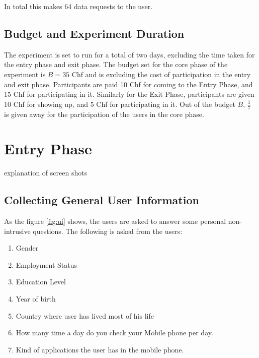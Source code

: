 In total this makes 64 data requests to the user.

\subsection{Budget and Experiment Duration}
The experiment is set to run for a total of two days, excluding the time taken for the entry phase and exit phase.
The budget set for the core phase of the experiment is $B=35$ Chf and is excluding the cost of participation
in the entry and exit phase. Participants are paid 10 Chf for coming to the Entry Phase, and 15 Chf for
participating in it. Similarly for the Exit Phase, participants are given 10 Chf for showing up, and 5 Chf for participating in it.
Out of the budget $B$, $\frac{1}{7}$ is given away for the participation of the users in the core phase.


\section{Entry Phase}
explanation of screen shots

\subsection{Collecting General User Information}
As the figure \ref{fig:ui} shows, the users are asked to answer some personal non-intrusive questions. The following is asked from the users: 
\begin{enumerate}
    \item Gender
    \item Employment Status
    \item Education Level
    \item Year of birth
    \item Country where user has lived most of his life
    \item How many time a day do you check your Mobile phone per day.
    \item Kind of applications the user has in the mobile phone.
\end{enumerate}


